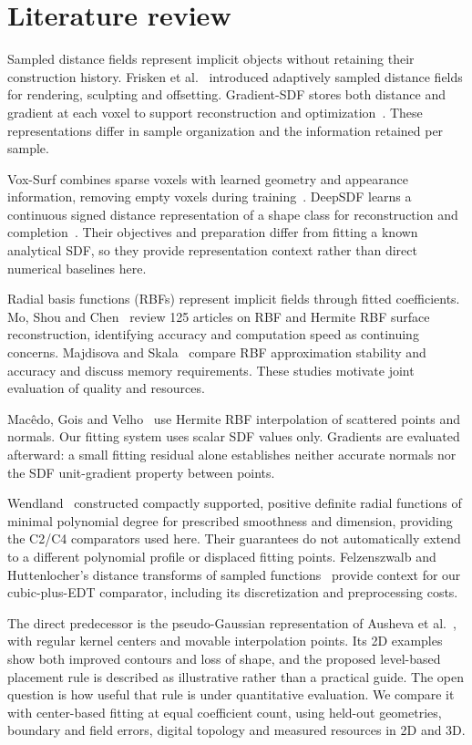 \documentclass[12pt,letterpaper]{article}
\begin{document}
\section{Literature review}
Sampled distance fields represent implicit objects without retaining their construction history. Frisken et al.~\cite{frisken2000} introduced adaptively sampled distance fields for rendering, sculpting and offsetting. Gradient-SDF stores both distance and gradient at each voxel to support reconstruction and optimization~\cite{sommer2022}. These representations differ in sample organization and the information retained per sample.

Vox-Surf combines sparse voxels with learned geometry and appearance information, removing empty voxels during training~\cite{li2024}. DeepSDF learns a continuous signed distance representation of a shape class for reconstruction and completion~\cite{park2019}. Their objectives and preparation differ from fitting a known analytical SDF, so they provide representation context rather than direct numerical baselines here.

Radial basis functions (RBFs) represent implicit fields through fitted coefficients. Mo, Shou and Chen~\cite{mo2022} review 125 articles on RBF and Hermite RBF surface reconstruction, identifying accuracy and computation speed as continuing concerns. Majdisova and Skala~\cite{majdisova2017} compare RBF approximation stability and accuracy and discuss memory requirements. These studies motivate joint evaluation of quality and resources.

Mac\^{e}do, Gois and Velho~\cite{macedo2009} use Hermite RBF interpolation of scattered points and normals. Our fitting system uses scalar SDF values only. Gradients are evaluated afterward: a small fitting residual alone establishes neither accurate normals nor the SDF unit-gradient property between points.

Wendland~\cite{wendland1995} constructed compactly supported, positive definite radial functions of minimal polynomial degree for prescribed smoothness and dimension, providing the C2/C4 comparators used here. Their guarantees do not automatically extend to a different polynomial profile or displaced fitting points. Felzenszwalb and Huttenlocher's distance transforms of sampled functions~\cite{felzenszwalb2012} provide context for our cubic-plus-EDT comparator, including its discretization and preprocessing costs.

The direct predecessor is the pseudo-Gaussian representation of Ausheva et al.~\cite{kaleniuk2025}, with regular kernel centers and movable interpolation points. Its 2D examples show both improved contours and loss of shape, and the proposed level-based placement rule is described as illustrative rather than a practical guide. The open question is how useful that rule is under quantitative evaluation. We compare it with center-based fitting at equal coefficient count, using held-out geometries, boundary and field errors, digital topology and measured resources in 2D and 3D.
\end{document}
